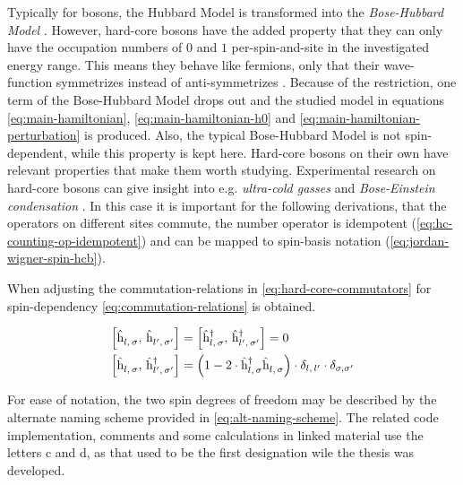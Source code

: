 Typically for bosons, the Hubbard Model is transformed into the \emph{Bose-Hubbard Model} \cite{boseHubbardModelOriginalDerivation}.
However, hard-core bosons have the added property that they can only have the occupation numbers of $0$ and $1$ per-spin-and-site in the investigated energy range.
This means they behave like fermions, only that their wave-function symmetrizes instead of anti-symmetrizes \cite{schwablBook}.
Because of the restriction, one term of the Bose-Hubbard Model drops out and the studied model in equations \ref{eq:main-hamiltonian}, \ref{eq:main-hamiltonian-h0} and \ref{eq:main-hamiltonian-perturbation} is produced.
Also, the typical Bose-Hubbard Model is not spin-dependent, while this property is kept here.
Hard-core bosons on their own have relevant properties that make them worth studying. 
Experimental research on hard-core bosons can give insight into e.g. \emph{ultra-cold gasses} and \emph{Bose-Einstein condensation} \cite{hardCoreBosonsBasics}. 
In this case it is important for the following derivations, that the operators on different sites commute, the number operator is idempotent (\ref{eq:hc-counting-op-idempotent}) and can be mapped to spin-basis notation (\ref{eq:jordan-wigner-spin-hcb}).

When adjusting the commutation-relations in \autoref{eq:hard-core-commutators} for spin-dependency \autoref{eq:commutation-relations} is obtained.

\begin{equation}
    \label{eq:commutation-relations}
    \begin{split}
        \left[\withspinhcop[]{l}{\sigma}{},\,\withspinhcop[]{l'}{\sigma'}{}\right] &= 
        \left[\withspinhcop[]{l}{\sigma}{\dagger},\,\withspinhcop[]{l'}{\sigma'}{\dagger}\right] = 0\\
        \left[\withspinhcop[]{l}{\sigma}{},\,\withspinhcop[]{l'}{\sigma'}{\dagger}\right] &= 
        \left(1 - 2 \cdot \withspinhcop[]{l}{\sigma}{\dagger}\withspinhcop[]{l}{\sigma}{} \right) \cdot \delta_{l,\,l'}\cdot\delta_{\sigma,\sigma'}
    \end{split}
\end{equation}

For ease of notation, the two spin degrees of freedom may be described by the alternate naming scheme provided in \autoref{eq:alt-naming-scheme}.
The related code implementation, comments and some calculations in linked material \cite{selfCode} use the letters c and d, as that used to be the first designation wile the thesis was developed.

